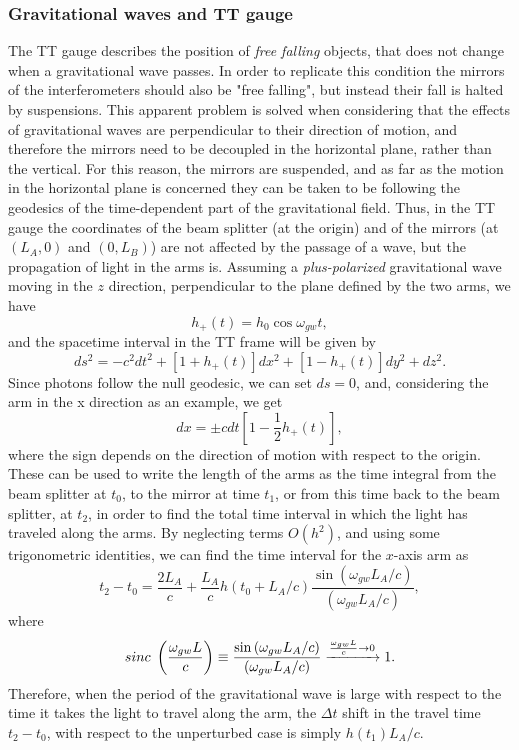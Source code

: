 \subsubsection{Gravitational waves and TT gauge}
The TT gauge describes the position of \textit{free falling} objects, that does not change when a gravitational wave passes. 
In order to replicate this condition the mirrors of the interferometers should also be "free falling", but instead their fall is halted by suspensions.
This apparent problem is solved when considering that the effects of gravitational waves are perpendicular to their direction of motion, and therefore the mirrors need to be decoupled in the horizontal plane, rather than the vertical.
For this reason, the mirrors are suspended, and as far as the motion in the horizontal plane is concerned they can be taken to be following the geodesics of the time-dependent part of the gravitational field.
Thus, in the TT gauge the coordinates of the beam splitter (at the origin) and of the mirrors (at $(L_A,0)$ and $(0,L_B)$) are not affected by the passage of a wave, but the propagation of light in the arms is.
Assuming a \textit{plus-polarized} gravitational wave moving in the $z$ direction, perpendicular to the plane defined by the two arms, we have 
\[
    h_+(t)=h_0\cos{\omega_{gw}t},
\]
and the spacetime interval in the TT frame will be given by
\[
    ds^2= -c^2dt^2 + [1+h_+ (t)]dx^2 + [1- h_+(t)]dy^2 + dz^2.
\]
Since photons follow the null geodesic, we can set $ds=0$, and, considering the arm in the x direction as an example, we get 
\[
    dx = \pm cdt\left[1-\frac{1}{2}h_+(t)\right], 
\]
where the sign depends on the direction of motion with respect to the origin. 
These can be used to write the length of the arms as the time integral from the beam splitter at $t_0$, to the mirror at time $t_1$, or from this time back to the beam splitter, at $t_2$, in order to find the total time interval in which the light has traveled along the arms.
By neglecting terms $O(h^2)$, and using some trigonometric identities, we can find the time interval for the $x$-axis arm as 
\begin{equation}
    t_2-t_0 = \frac{2L_A}{c} + \frac{L_A}{c}h(t_0+L_A/c)\frac{\sin{(\omega_{gw}L_A/c)}}{(\omega_{gw}L_A/c)},
    \label{eq: time interval for x-axis}
\end{equation}
where 
\[
    sinc\hspace{1mm}\left(\frac{\omega_{gw}L}{c}\right) \equiv \frac{\sin{(\omega_{gw}L_A/c)}}{(\omega_{gw}L_A/c)}\xrightarrow{\frac{\omega_{gw}L}{c}\to0}1.
\]
Therefore, when the period of the gravitational wave is large with respect to the time it takes the light to travel along the arm, the $\Delta t$ shift in the travel time $t_2 - t_0$, with respect to the unperturbed case is simply $h(t_1)L_A/c$.
